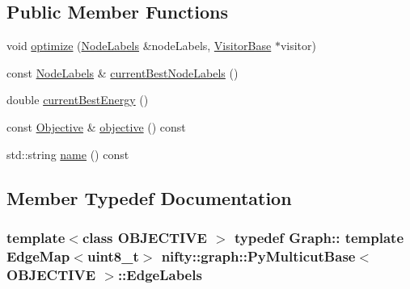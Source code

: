 \subsection*{Public Member Functions}
\begin{DoxyCompactItemize}
\item 
void \hyperlink{classnifty_1_1graph_1_1PyMulticutBase_a91dc3cdb4396e61b03ae08d2bfe7f3a3}{optimize} (\hyperlink{classnifty_1_1graph_1_1MulticutBase_afba61ad2919d0fad20b3745af19309da}{Node\+Labels} \&node\+Labels, \hyperlink{classnifty_1_1graph_1_1MulticutBase_a5882fb69df59d8113f6a81a0dac26eaa}{Visitor\+Base} $\ast$visitor)
\item 
const \hyperlink{classnifty_1_1graph_1_1MulticutBase_afba61ad2919d0fad20b3745af19309da}{Node\+Labels} \& \hyperlink{classnifty_1_1graph_1_1PyMulticutBase_a9704cb7e677bb7dd4fad3e0dae4d6a14}{current\+Best\+Node\+Labels} ()
\item 
double \hyperlink{classnifty_1_1graph_1_1PyMulticutBase_ac52064675fb1e9a3f179d5732e840931}{current\+Best\+Energy} ()
\item 
const \hyperlink{classnifty_1_1graph_1_1MulticutBase_a7d014a4aa2d6e8fa3cd58b70b95ca829}{Objective} \& \hyperlink{classnifty_1_1graph_1_1PyMulticutBase_af5ce7993493d045925282d1ba82081a8}{objective} () const 
\item 
std\+::string \hyperlink{classnifty_1_1graph_1_1PyMulticutBase_a8a0dae8a98125124f19255ae90f82e5a}{name} () const 
\end{DoxyCompactItemize}


\subsection{Member Typedef Documentation}
\hypertarget{classnifty_1_1graph_1_1PyMulticutBase_a3826da095b2a48866479f983673760d9}{}
\subsubsection[{Edge\+Labels}]{\setlength{\rightskip}{0pt plus 5cm}template$<$class O\+B\+J\+E\+C\+T\+I\+V\+E $>$ typedef Graph\+:: template Edge\+Map$<$uint8\+\_\+t$>$ {\bf nifty\+::graph\+::\+Py\+Multicut\+Base}$<$ O\+B\+J\+E\+C\+T\+I\+V\+E $>$\+::{\bf Edge\+Labels}}\label{classnifty_1_1graph_1_1PyMulticutBase_a3826da095b2a48866479f983673760d9}
\hypertarget{classnifty_1_1graph_1_1PyMulticutBase_adcef0a06c28d00ad248e6118b96c3630}{}
